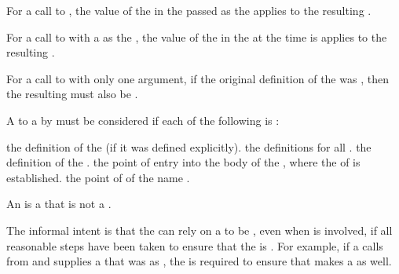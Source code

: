 \itemitem{\bull}
For a call to , the value of the
  in the 
 passed as the   applies 
to the resulting .

\itemitem{\bull}
For a call to  with a  as the
, the value of the  
in the  at the time  is 
applies to the resulting .

\itemitem{\bull}
For a call to  with only one argument, if the original definition
of the  was , then the resulting 
must also be .

\itemitem{\bull}
A  to a  by  must be 
considered  if each of the following is :

\beginlist
\itemitem{--} the definition of the  (if it was defined explicitly).
\itemitem{--} the  definitions for all  .
\itemitem{--} the definition of the .
\itemitem{--} the point of entry into the body of the ,
	      where the  of  is established.
\itemitem{--} the point of  of the name .
\endlist

\endlist

An  is a  that is not a .

The informal intent is that the  can rely on a 
to be , even when  is involved, if all reasonable
steps have been taken to ensure that the  is .
For example, if a  calls  from 
 and supplies a  that was  
as , the  is required to ensure that
 makes a  as well.

